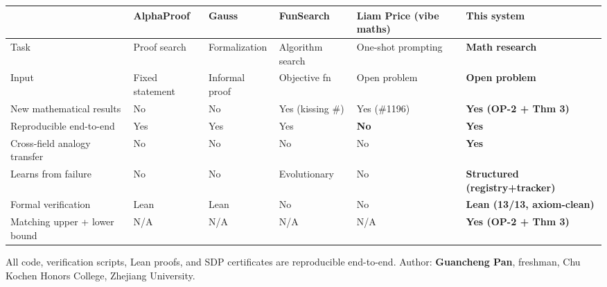 \documentclass[
  10.5pt,
]{article}
\newcounter{none} %
\begin{document}
{\def\LTcaptype{none} %
\begin{longtable}[]{@{}
  >{\raggedright\arraybackslash}p{}
  >{\centering\arraybackslash}p{}
  >{\centering\arraybackslash}p{}
  >{\centering\arraybackslash}p{}
  >{\centering\arraybackslash}p{}
  >{\centering\arraybackslash}p{}@{}}
\toprule\noalign{}
\begin{minipage}[b]{\linewidth}\raggedright
\end{minipage} & \begin{minipage}[b]{\linewidth}\centering
AlphaProof
\end{minipage} & \begin{minipage}[b]{\linewidth}\centering
Gauss
\end{minipage} & \begin{minipage}[b]{\linewidth}\centering
FunSearch
\end{minipage} & \begin{minipage}[b]{\linewidth}\centering
Liam Price (vibe maths)
\end{minipage} & \begin{minipage}[b]{\linewidth}\centering
\textbf{This system}
\end{minipage} \\
\midrule\noalign{}
\endhead
\bottomrule\noalign{}
\endlastfoot
Task & Proof search & Formalization & Algorithm search & One-shot
prompting & \textbf{Math research} \\
Input & Fixed statement & Informal proof & Objective fn & Open problem &
\textbf{Open problem} \\
New mathematical results & No & No & Yes (kissing \#) & Yes (\#1196) &
\textbf{Yes (OP-2 + Thm 3)} \\
Reproducible end-to-end & Yes & Yes & Yes & \textbf{No} &
\textbf{Yes} \\
Cross-field analogy transfer & No & No & No & No & \textbf{Yes} \\
Learns from failure & No & No & Evolutionary & No & \textbf{Structured
(registry+tracker)} \\
Formal verification & Lean & Lean & No & No & \textbf{Lean (13/13,
axiom-clean)} \\
Matching upper + lower bound & N/A & N/A & N/A & N/A & \textbf{Yes (OP-2
+ Thm 3)} \\
\end{longtable}
}

All code, verification scripts, Lean proofs, and SDP certificates are
reproducible end-to-end. Author: \textbf{Guancheng Pan}, freshman, Chu
Kochen Honors College, Zhejiang University.
\end{document}
